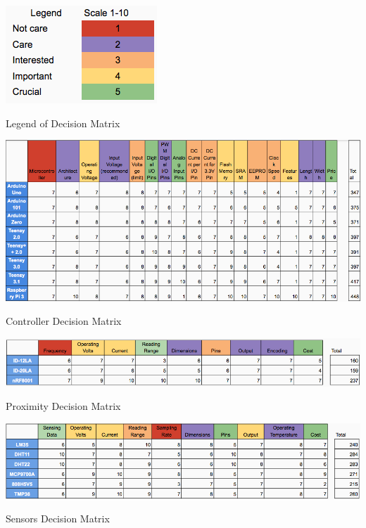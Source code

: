 \documentclass[12pt]{article}
\begin{document}
\newpage
\begin{appendix}

  \listoffigures
  \listoftables

  \begin{table}[!htb]
    \begin{center}
      \includegraphics[scale=1]{Figures/DecisionMatrixLegend}
    \end{center}
    \caption{Legend of Decision Matrix}
    \label{tabl:DecLegend}
  \end{table}

  \begin{table}[!htb]
    \includegraphics[width=\textwidth]{Figures/DecisionMatrixController}
    \caption{Controller Decision Matrix}
     \label{tabl:DecController}
  \end{table}

  \begin{table}[!htb]
    \includegraphics[width=\textwidth]{Figures/DecisionMatrixProximity}
    \caption{Proximity Decision Matrix}
     \label{tabl:DecProximity}
  \end{table}

  \begin{table}[!htb]
    \includegraphics[width=\textwidth]{Figures/DecisionMatrixSensors}
    \caption{Sensors Decision Matrix}
     \label{tabl:DecSensors}
  \end{table}


\end{appendix}
\end{document}

